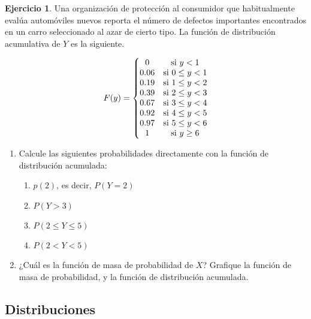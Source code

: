 \documentclass[
]{book}
\providecommand{\tightlist}{%
  \setlength{\itemsep}{0pt}\setlength{\parskip}{0pt}}
\theoremstyle{definition}
\theoremstyle{definition}
\theoremstyle{definition}
\newtheorem{exercise}{Ejercicio}[chapter]
\theoremstyle{definition}
\theoremstyle{remark}
\begin{document}
\begin{exercise}

Una organización de protección al consumidor que habitualmente evalúa automóviles nuevos reporta el número de defectos importantes encontrados en un carro seleccionado al azar de cierto tipo. La función de distribución acumulativa de \(Y\) es la siguiente.

\begin{equation}
\notag
\begin{split}
F(y) = \left\lbrace
\begin{matrix}
0 & \text{si } y < 1\\
0.06 & \text{si } 0\leq y < 1\\
0.19 & \text{si } 1\leq y < 2\\
0.39 & \text{si } 2\leq y < 3\\
0.67 & \text{si } 3\leq y < 4\\
0.92 & \text{si } 4\leq y < 5\\
0.97 & \text{si } 5\leq y < 6\\
1 & \text{si } y\geq 6\\
\end{matrix}
\right.
\end{split}
\end{equation}

\begin{enumerate}
\def\labelenumi{\arabic{enumi}.}
\item
  Calcule las siguientes probabilidades directamente con la función de distribución acumulada:

  \begin{enumerate}
  \def\labelenumii{\alph{enumii}.}
  \tightlist
  \item
    \(p(2)\), es decir, \(P(Y=2)\)
  \item
    \(P(Y>3)\)
  \item
    \(P(2\leq Y\leq 5)\)
  \item
    \(P(2 < Y < 5)\)
  \end{enumerate}
\item
  ¿Cuál es la función de masa de probabilidad de \(X\)? Grafique la función de masa de probabilidad, y la función de distribución acumulada.
\end{enumerate}

\end{exercise}

\hypertarget{distribuciones}{%
\subsection{Distribuciones}\label{distribuciones}}
\end{document}

